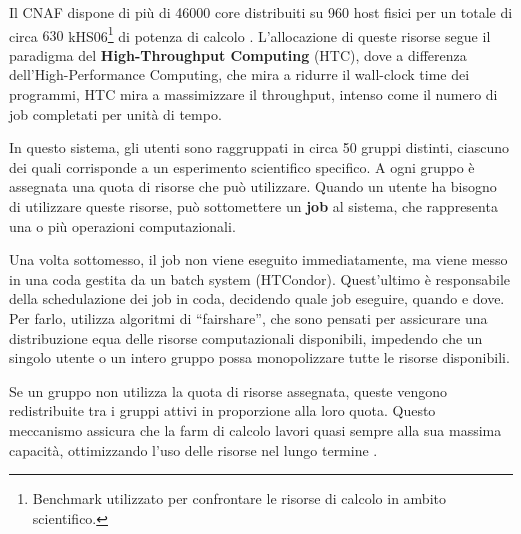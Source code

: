 Il CNAF dispone di più di 46000 core distribuiti su 960 host fisici per un
totale di circa $630$ kHS06\footnote{Benchmark utilizzato per confrontare le
risorse di calcolo in ambito scientifico.} di potenza di calcolo
\cite{hepix2022}. L'allocazione di queste risorse segue il paradigma del
\textbf{High-Throughput Computing} (HTC), dove a differenza
dell'High-Performance Computing, che mira a ridurre il wall-clock time dei
programmi, HTC mira a massimizzare il throughput, intenso come il numero di
job completati per unità di tempo.

In questo sistema, gli utenti sono raggruppati in circa 50 gruppi distinti,
ciascuno dei quali corrisponde a un esperimento scientifico specifico. A ogni
gruppo è assegnata una quota di risorse che può utilizzare. Quando un utente
ha bisogno di utilizzare queste risorse, può sottomettere un \textbf{job} al
sistema, che rappresenta una o più operazioni computazionali.

Una volta sottomesso, il job non viene eseguito immediatamente, ma viene messo
in una coda gestita da un batch system (HTCondor). Quest'ultimo è responsabile
della schedulazione dei job in coda, decidendo quale job eseguire, quando e
dove. Per farlo, utilizza algoritmi di ``fairshare'', che sono pensati per
assicurare una distribuzione equa delle risorse computazionali disponibili,
impedendo che un singolo utente o un intero gruppo possa monopolizzare tutte
le risorse disponibili.


Se un gruppo non utilizza la quota di risorse assegnata, queste vengono
redistribuite tra i gruppi attivi in proporzione alla loro quota. Questo
meccanismo assicura che la farm di calcolo lavori quasi sempre alla sua
massima capacità, ottimizzando l'uso delle risorse nel lungo termine
\cite{cnaf_calcolo}.


